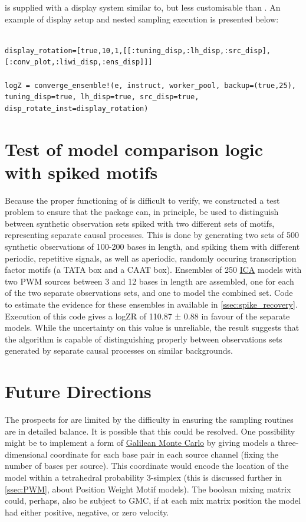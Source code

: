 \documentclass{ut-thesis}
\begin{document}
\begin{NoHyper}
 is supplied with a display system similar to, but less customisable than . An example of display setup and nested sampling execution is presented below:

\begin{verbatim}

display_rotation=[true,10,1,[[:tuning_disp,:lh_disp,:src_disp],[:conv_plot,:liwi_disp,:ens_disp]]]

logZ = converge_ensemble!(e, instruct, worker_pool, backup=(true,25), tuning_disp=true, lh_disp=true, src_disp=true, disp_rotate_inst=display_rotation)
\end{verbatim}

\section{Test of model comparison logic with spiked motifs}
Because the proper functioning of  is difficult to verify, we constructed a test problem to ensure that the package can, in principle, be used to distinguish between synthetic observation sets spiked with two different sets of motifs, representing separate causal processes. This is done by generating two sets of 500 synthetic observations of 100-200 bases in length, and spiking them with different periodic, repetitive signals, as well as aperiodic, randomly occuring transcription factor motifs (a TATA box and a CAAT box). Ensembles of 250 \hyperref[ssec:ICA]{ICA} models with two PWM sources between 3 and 12 bases in length are assembled, one for each of the two separate observations sets, and one to model the combined set. Code to estimate the evidence for these ensembles in available in \autoref{ssec:spike_recovery}. Execution of this code gives a logZR of 110.87 ± 0.88 in favour of the separate models. While the uncertainty on this value is unreliable, the result suggests that the algorithm is capable of distinguishing properly between observations sets generated by separate causal processes on similar backgrounds.

\section{Future Directions}
The prospects for  are limited by the difficulty in ensuring the sampling routines are in detailed balance. It is possible that this could be resolved. One possibility might be to implement a form of \hyperref[ssec:GMC]{Galilean Monte Carlo} by giving models a three-dimensional coordinate for each base pair in each source channel (fixing the number of bases per source). This coordinate would encode the location of the model within a tetrahedral probability 3-simplex (this is discussed further in \autoref{ssec:PWM}, about Position Weight Motif models). The boolean mixing matrix could, perhaps, also be subject to GMC, if at each mix matrix position the model had either positive, negative, or zero velocity.


\end{NoHyper}
\end{document}
